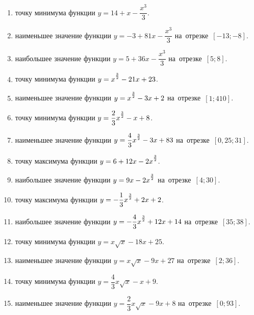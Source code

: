 \documentclass[a4paper,10pt]{article}
\begin{document}
\begin{enumerate}
\item {} точку минимума функции $y=14 +x-\dfrac{x^3}{3}$.

\item {} наименьшее значение функции $y=-3 +81x-\dfrac{x^3}{3}$ на~отрезке~$\left[-13;-8\right]$.

\item {} наибольшее значение функции $y=5 +36x-\dfrac{x^3}{3}$ на~отрезке~$\left[5;8\right]$.

\item {} точку минимума функции $y=x\strut^{\frac{3}{2}} -21x+23$.

\item {} наименьшее значение функции $y=x\strut^{\frac{3}{2}} -3x+2$ на~отрезке~$\left[1;410\right]$.

\item {} точку минимума функции $y=\dfrac{2}{3}x\strut^{\frac{3}{2}} -x+8$.

\item {} наименьшее значение функции $y=\dfrac{4}{3}x\strut^{\frac{3}{2}} -3x+83$ на~отрезке~$\left[0,25;31\right]$.

\item {} точку максимума функции $y=6+12x-2x\strut^{\frac{3}{2}}$.

\item {} наибольшее значение функции $y=9x-2x\strut^{\frac{3}{2}}$ на~отрезке~$\left[4;30\right]$.

\item {} точку максимума функции $y=-\dfrac{1}{3}x\strut^{\frac{3}{2}} +2x+2$.

\item {} наибольшее значение функции $y=-\dfrac{4}{3}x\strut^{\frac{3}{2}} +12x+14$ на~отрезке~$\left[35;38\right]$.

\item {} точку минимума функции $y=x\sqrt{x} -18x+25$.

\item {} наименьшее значение функции $y=x\sqrt{x} -9x+27$ на~отрезке~$\left[2;36\right]$.

\item {} точку минимума функции $y=\dfrac{4}{3}x\sqrt{x} -x+9$.

\item {} наименьшее значение функции $y=\dfrac{2}{3}x\sqrt{x} -9x+8$ на~отрезке~$\left[0;93\right]$.


\end{enumerate}
\end{document}
